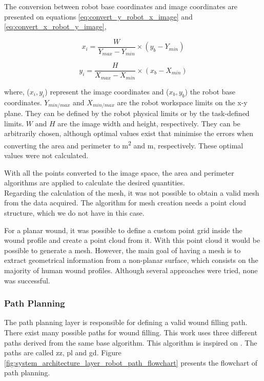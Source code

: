 The conversion between robot base coordinates and image coordinates are presented on equations \ref{eq:convert_y_robot_x_image} and \ref{eq:convert_x_robot_y_image},

\begin{equation}
\label{eq:convert_y_robot_x_image}
    x_i = \frac{W}{Y_{max} - Y_{min}} \times (y_b - Y_{min})
\end{equation}

\begin{equation}
\label{eq:convert_x_robot_y_image}
    y_i = \frac{H}{X_{max} - X_{min}} \times (x_b - X_{min})
\end{equation}

where, ($x_i, y_i$) represent the image coordinates and ($x_b, y_b$) the robot base coordinates. $Y_{min/max}$ and $X_{min/max}$ are the robot workspace limits on the x-y plane. They can be defined by the robot physical limits or by the task-defined limits. $W$ and $H$ are the image width and height, respectively. They can be arbitrarily chosen, although optimal values exist that minimise the errors when converting the area and perimeter to \si{\meter \squared} and \si{\meter}, respectively. These optimal values were not calculated.

With all the points converted to the image space, the area and perimeter algorithms are applied to calculate the desired quantities.\\

Regarding the calculation of the mesh, it was not possible to obtain a valid mesh from the data acquired. The algorithm for mesh creation needs a point cloud structure, which we do not have in this case.

For a planar wound, it was possible to define a custom point grid inside the wound profile and create a point cloud from it. With this point cloud it would be possible to generate a mesh. However, the main goal of having a mesh is to extract geometrical information from a non-planar surface, which consists on the majority of human wound profiles. Although several approaches were tried, none was successful.


\subsubsection*{Path Planning}
\label{subsubsec:system_architectural_robot_layers_path_planning}

The path planning layer is responsible for defining a valid wound filling path. There exist many possible paths for wound filling. This work uses three different paths derived from the same base algorithm. This algorithm is inspired on \cite{Ding2018_simulated_insitu_bioprinting_wound_bed_path_planning}. The paths are called \gls{zz}, \gls{pl} and \gls{gd}. Figure \ref{fig:system_architecture_layer_robot_path_flowchart} presents the flowchart of path planning.

